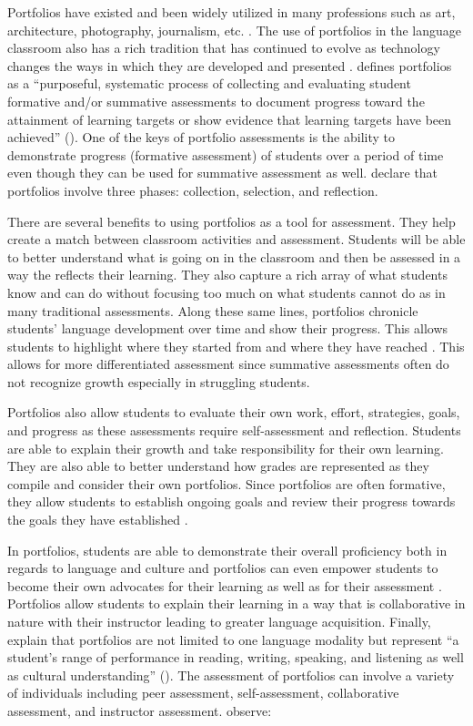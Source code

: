\documentclass[output=paper]{langscibook}
\begin{document}
  Portfolios have existed and been widely utilized in many professions such as art, architecture, photography, journalism, etc. \citep{Lam2017}. The use of portfolios in the language classroom also has a rich tradition that has continued to evolve as technology changes the ways in which they are developed and presented \citep{Fox2016,Lam2017,McMillan2018}. \citet{McMillan2018} defines portfolios as a “purposeful, systematic process of collecting and evaluating student formative and/or summative assessments to document progress toward the attainment of learning targets or show evidence that learning targets have been achieved” (\citeyear[303]{McMillan2018}). One of the keys of portfolio assessments is the ability to demonstrate progress (formative assessment) of students over a period of time even though they can be used for summative assessment as well. \citet{Hamp-LyonsCondon2000} declare that portfolios involve three phases: collection, selection, and reflection.

There are several benefits to using portfolios as a tool for assessment. They help create a match between classroom activities and assessment. Students will be able to better understand what is going on in the classroom and then be assessed in a way the reflects their learning. They also capture a rich array of what students know and can do without focusing too much on what students cannot do as in many traditional assessments. Along these same lines, portfolios chronicle students’ language development over time and show their progress. This allows students to highlight where they started from and where they have reached \citep{GeneseeUpshur1996}. This allows for more differentiated assessment since summative assessments often do not recognize growth especially in struggling students.

Portfolios also allow students to evaluate their own work, effort, strategies, goals, and progress as these assessments require self-assessment and reflection. Students are able to explain their growth and take responsibility for their own learning. They are also able to better understand how grades are represented as they compile and consider their own portfolios. Since portfolios are often formative, they allow students to establish ongoing goals and review their progress towards the goals they have established \citep{TedickKlee1998}.

In portfolios, students are able to demonstrate their overall proficiency both in regards to language and culture and portfolios can even empower students to become their own advocates for their learning as well as for their assessment \citep{AlamAkar2019}. Portfolios allow students to explain their learning in a way that is collaborative in nature with their instructor leading to greater language acquisition. Finally, \citep{TedickKlee1998} explain that portfolios are not limited to one language modality but represent “a student’s range of performance in reading, writing, speaking, and listening as well as cultural understanding” (\citeyear[20]{TedickKlee1998}). The assessment of portfolios can involve a variety of individuals including peer assessment, self-assessment, collaborative assessment, and instructor assessment. \citet{TedickKlee1998} observe:
\end{document}
